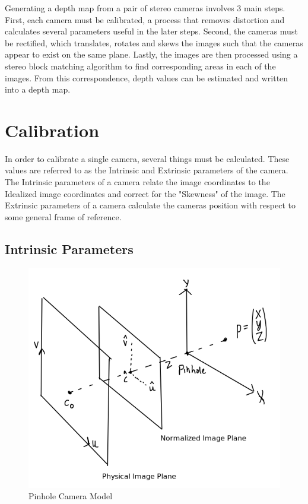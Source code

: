 \thispagestyle{plain}
Generating a depth map from a pair of stereo cameras involves 3 main steps.  First, each camera must be calibrated, a process that removes distortion and calculates several parameters useful in the later steps.  Second, the cameras must be rectified, which translates, rotates and skews the images such that the cameras appear to exist on the same plane.  Lastly, the images are then processed using a stereo block matching algorithm to find corresponding areas in each of the images.  From this correspondence, depth values can be estimated and written into a depth map.

\section{Calibration}
In order to calibrate a single camera, several things must be calculated.  These values are referred to as the Intrinsic and Extrinsic parameters of the camera.  The Intrinsic parameters of a camera relate the image coordinates to the Idealized image coordinates and correct for the "Skewness" of the image. The Extrinsic parameters of a camera calculate the cameras position with respect to some general frame of reference.


\subsection{Intrinsic Parameters}

\begin{figure}[h!]
\begin{center}
  \includegraphics[scale=.5]{Image1}
  \caption{Pinhole Camera Model}
  \label{fig:Pinhole}
\end{center}
\end{figure}


